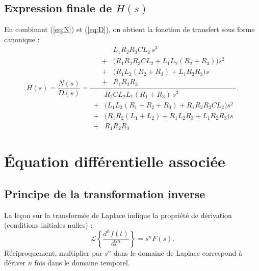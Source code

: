\documentclass[12pt,a4paper]{article}
\begin{document}
\subsection{Expression finale de \(H(s)\)}
En combinant (\ref{eq:N}) et (\ref{eq:D}), on obtient la fonction de transfert sous forme canonique :
\begin{equation}
\boxed{
H(s) = \frac{N(s)}{D(s)} =
\frac{
\begin{aligned}
&L_1 R_2 R_3 C L_2 \, s^3 \\
+ &\bigl( R_1 R_2 R_3 C L_2 + L_1 L_2 (R_2+R_3) \bigr) s^2 \\
+ &\bigl( R_1 L_2 (R_2+R_3) + L_1 R_2 R_3 \bigr) s \\
+ &R_1 R_2 R_3
\end{aligned}
}{
\begin{aligned}
&R_2 C L_2 L_1 (R_1+R_3) \, s^3 \\
+ &\bigl( L_1 L_2 (R_1+R_2+R_3) + R_1 R_2 R_3 C L_2 \bigr) s^2 \\
+ &\bigl( R_1 R_2 (L_1+L_2) + R_1 L_2 R_3 + L_1 R_2 R_3 \bigr) s \\
+ &R_1 R_2 R_3
\end{aligned}
}} .
\label{eq:Hfinal}
\end{equation}

\section{Équation différentielle associée}

\subsection{Principe de la transformation inverse}
La leçon sur la transformée de Laplace indique la propriété de dérivation (conditions initiales nulles) :
\[
\mathcal{L}\left\{ \frac{d^n f(t)}{dt^n} \right\} = s^n F(s) .
\]
Réciproquement, multiplier par \(s^n\) dans le domaine de Laplace correspond à dériver \(n\) fois dans le domaine temporel.
\end{document}
